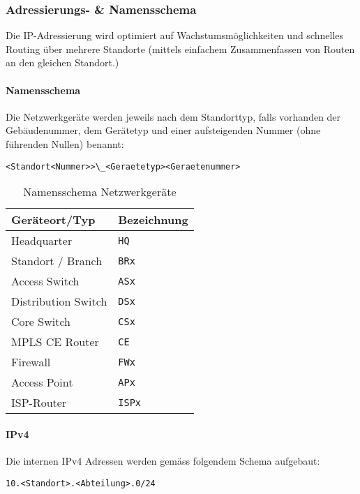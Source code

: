 \subsubsection{Adressierungs- \& Namensschema}

Die IP-Adressierung wird optimiert auf Wachstumsmöglichkeiten und schnelles Routing über mehrere Standorte (mittels einfachem Zusammenfassen von Routen an den gleichen Standort.)

\paragraph{Namensschema}

Die Netzwerkgeräte werden jeweils nach dem Standorttyp, falls vorhanden der Gebäudenummer, dem Gerätetyp und einer aufsteigenden Nummer (ohne führenden Nullen) benannt:

\lstinline|<Standort<Nummer>>\_<Geraetetyp><Geraetenummer>|

\begin{table}[h]
	\centering
	\begin{tabu}{l l}
		\toprule 
		Geräteort/Typ & Bezeichnung \\
		\midrule
		Headquarter & \lstinline|HQ|\\
		Standort / Branch & \lstinline|BRx| \\
		\midrule
		Access Switch & \lstinline|ASx|\\
		Distribution Switch & \lstinline|DSx|\\
		Core Switch & \lstinline|CSx|\\
		MPLS CE Router & \lstinline|CE|\\
		Firewall & \lstinline|FWx| \\
		Access Point & \lstinline|APx| \\
		ISP-Router & \lstinline|ISPx| \\
		\bottomrule
	\end{tabu}
	\label{tbl:abteilung_ipv4_adressblock}
	\caption{Namensschema Netzwerkgeräte}
\end{table}

\paragraph{IPv4}

Die internen IPv4 Adressen werden gemäss folgendem Schema aufgebaut: 

 \lstinline|10.<Standort>.<Abteilung>.0/24|
 
